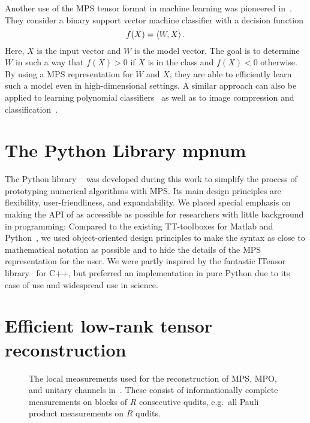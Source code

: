 Another use of the MPS tensor format in machine learning was pioneered in~\cite{Stoudenmire_2016_Supervised}.
They consider a binary support vector machine classifier with a decision function
\[
  f(X) = \braket{W, X}.
\]
Here, $X$ is the input vector and $W$ is the model vector.
The goal is to determine $W$ in such a way that $f(X) > 0$ if $X$ is in the  class and $f(X) < 0$ otherwise.
By using a MPS representation for $W$ and $X$, they are able to efficiently learn such a model even in high-dimensional settings.
A similar approach can also be applied to learning polynomial classifiers~\cite{Chen_2017_Parallelized} as well as to image compression and classification~\cite{Bengua}.



\section{The Python Library mpnum}%
\label{sec:tensors.mpnum}

The Python library \mpnum~\cite{} was developed during this work to simplify the process of prototyping numerical algorithms with MPS.
Its main design principles are flexibility, user-friendliness, and expandability.
We placed special emphasis on making the API of \mpnum as accessible as possible for researchers with little background in programming:
Compared to the existing TT-toolboxes for Matlab and Python~\cite{}, we used object-oriented design principles to make the syntax as close to mathematical notation as possible and to hide the details of the MPS representation for the user.
We were partly inspired by the fantastic ITensor library~\cite{} for C++, but preferred an implementation in pure Python due to its ease of use and widespread use in science.





\section{Efficient low-rank tensor reconstruction}%
\label{sec:tensors.als}

\begin{figure*}
  \centering
  
  \caption{%
    The local measurements used for the reconstruction of MPS, MPO, and unitary channels in~\cite{Cramer_2010_Efficient,Baumgratz_2013_Scalable,Baumgratz_2013_Scalablea,Lanyon_2017_Efficient,Holzaepfel_2014_Scalable}.
    These consist of informationally complete measurements on blocks of $R$ consecutive qudits, e.g.\ all Pauli product measurements on $R$ qudits.
    }%
  \label{fig:als.quantum_measurements}
\end{figure*}

